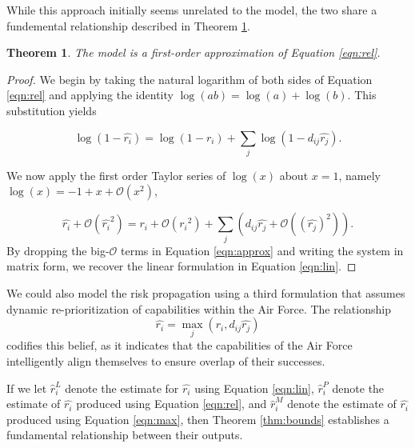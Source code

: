 \documentclass{article}
\newtheorem{thm}{Theorem}
\begin{document}
While this approach initially seems unrelated to the \citeauthor{haimes-iiom} model, the two share a fundemental relationship described in Theorem \ref{thm:first-order}. 
\begin{thm}
\label{thm:first-order}
The \citeauthor{haimes-iiom} model is a first-order approximation of Equation \ref{eqn:rel}.
\end{thm}
\begin{proof}
We begin by taking the natural logarithm of both sides of Equation \ref{eqn:rel} and applying the identity $\log(ab) = \log(a) + \log(b)$. This substitution yields

\begin{equation}
\log(1-\hat{r_i}) = \log(1-r_i) + \sum_j \log( 1-d_{ij}\hat{r_j}).
\end{equation}

We now apply the first order Taylor series of $\log(x)$ about $x=1$, namely $\log(x) = -1 + x + \mathcal{O}\left(x^2\right)$,

\begin{equation}
\label{eqn:approx}
\hat{r_i} + \mathcal{O}(\hat{r_i}^2) = {r_i} + \mathcal{O}\left({r_i}^2\right) + \sum_j \left(d_{ij}\hat{r_j} + \mathcal{O}\left((\hat{r_j})^2 \right)\right).
\end{equation}
By dropping the big-$\mathcal{O}$ terms in Equation \ref{eqn:approx} and writing the system in matrix form, we recover the linear formulation in Equation \ref{eqn:lin}.
\end{proof}

We could also model the risk propagation using a third formulation that assumes dynamic re-prioritization of capabilities within the Air Force. The relationship
\begin{equation}
\label{eqn:max}
\hat{r_i} = \max_j \left(r_i, d_{ij}\hat{r_j}\right)
\end{equation}
codifies this belief, as it indicates that the capabilities of the Air Force intelligently align themselves to ensure overlap of their successes. 

If we let $\hat{r}_i^L$ denote the estimate for $\hat{r_i}$ using Equation \ref{eqn:lin},  $\hat{r}_i^P$ denote the estimate of $\hat{r_i}$ produced using Equation \ref{eqn:rel}, and $\hat{r}_i^M$ denote the estimate of $\hat{r_i}$ produced using Equation \ref{eqn:max}, then Theorem \ref{thm:bounds} establishes a fundamental relationship between their outputs.
\end{document}
